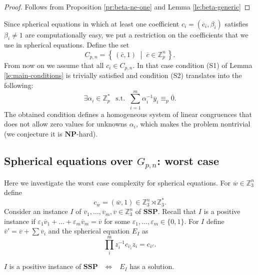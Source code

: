 \documentclass{jgcc}
\def\ovc{{\overline{c}}}
\def\ovo{{\overline{0}}}
\def\ovv{{\overline{v}}}
\def\ovy{{\overline{y}}}
\def\ovw{{\overline{w}}}
\def\NP{{\mathbf{NP}}}
\newcommand{\Set}[2]{\left\{\, #1 \;\middle|\; #2 \,\right\}}%
\def\MZ{{\mathbb{Z}}}
\def\SSP{{\mathbf{SSP}}}
\begin{document}
\begin{proof}
Follows from Proposition \ref{pr:beta-ne-one}
and Lemma \ref{le:beta-generic}
\end{proof}

Since spherical equations in which at least one coefficient 
$c_i=(\ovc_i,\beta_i)$ satisfies $\beta_i\ne 1$
are computationally easy,
we put a restriction on the coefficients that we use in spherical equations. 
Define the set
\begin{equation}\label{eq:C-p-n}
C_{p,n}=\Set{(\ovc,1)}{\ovc\in \MZ_p^n}.
\end{equation}
From now on we assume that all $c_i\in C_{p,n}$.
In that case condition (S1) of Lemma \ref{le:main-conditions}
is trivially satisfied and condition (S2) translates into
the following:
\begin{equation}\label{eq:nonzero-combination-problem}
\exists \alpha_i\in\MZ_p^\ast
\ \ \mbox{ s.t. }\ 
\sum_{i=1}^m \alpha_i^{-1} \ovy_i \equiv_p \ovo.
\end{equation}
The obtained condition defines a homogeneous system of linear
congruences that does not allow zero values for unknowns $\alpha_i$,
which makes the problem nontrivial (we conjecture it is $\NP$-hard).

\subsection{Spherical equations over $G_{p,n}$: worst case}
\label{se:sph-np-hard}

Here we investigate the worst case complexity for spherical equations.
For $\ovw\in\MZ_3^n$ define 
$$
c_\ovw = (\ovw,1)\in \MZ_{3}^n\rtimes \MZ_3^\ast.
$$
Consider an instance $I$ of $\ovv_1,\dots,\ovv_m,\ovv \in \MZ_3^n$ of $\SSP$.
Recall that $I$ is a positive instance if 
$\varepsilon_1\ovv_1+\dots+\varepsilon_m\ovv_m=\ovv$ for some 
$\varepsilon_1,\dots,\varepsilon_m\in\{0,1\}$.
For $I$ define $\ovv'=\ovv+\sum \ovv_i$ and
the spherical equation $E_I$ as
\begin{equation}\label{eq:E_I}
\prod_i^m z_i^{-1}c_{\ovv_i} z_i = c_{\ovv'}.
\end{equation}

\begin{prop}\label{pr:equations-worst-hard}
$I$ is a positive instance of $\SSP$
$\ \ \Leftrightarrow\ \ $
$E_I$ has a solution.
\end{prop}
\end{document}
